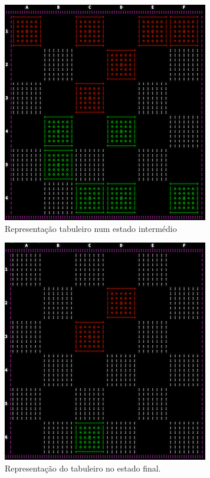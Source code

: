 \documentclass[paper=a4, fontsize=11pt]{scrartcl} %
\numberwithin{equation}{section} %
\numberwithin{figure}{section} %
\numberwithin{table}{section} %
\begin{document}
\begin{figure}[tb]
	\centering
	\includegraphics{tabuleiro_middle}
	\caption[PROLOG: tabuleiro estado intermédio]{Representação tabuleiro num estado intermédio} %
	\label{fig:middlestate} 
\end{figure}

\begin{figure}[tb]
	\centering
	\includegraphics{tabuleiro_final}
	\caption[PROLOG: tabuleiro estado final]{Representação do tabuleiro no estado final.} %
	\label{fig:finalstate} 
\end{figure}
\end{document}
